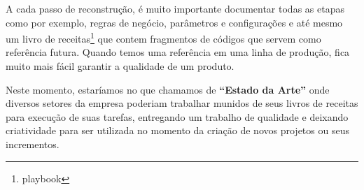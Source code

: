 A cada passo de reconstrução, é muito importante documentar todas as etapas como por exemplo, regras de negócio, parâmetros e configurações e até mesmo um livro de receitas\footnote{playbook} que contem fragmentos de códigos que servem como referência futura. Quando temos uma referência em uma linha de produção, fica muito mais fácil garantir a qualidade de um produto.

Neste momento, estaríamos no que chamamos de \textbf{``Estado da Arte''} onde diversos setores da empresa poderiam trabalhar munidos de seus livros de receitas para execução de suas tarefas, entregando um trabalho de qualidade e deixando criatividade para ser utilizada no momento da criação de novos projetos ou seus incrementos.